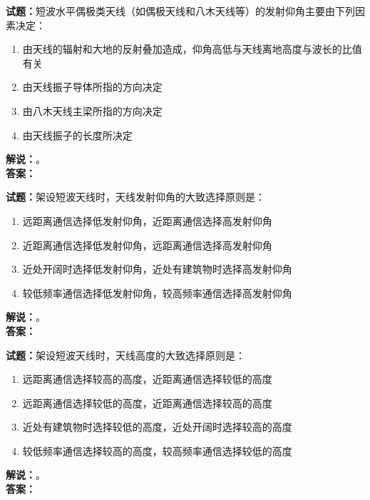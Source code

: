 \documentclass{ctexbook}
\begin{document}
\bigskip




\noindent\textbf{试题：}短波水平偶极类天线（如偶极天线和八木天线等）的发射仰角主要由下列因素决定：
\begin{enumerate}[leftmargin=3em]
\item 由天线的辐射和大地的反射叠加造成，仰角高低与天线离地高度与波长的比值有关
\item 由天线振子导体所指的方向决定
\item 由八木天线主梁所指的方向决定
\item 由天线振子的长度所决定
\end{enumerate}
\noindent\textbf{解说：}\textbf{}。\\\noindent\textbf{答案：}

\bigskip




\noindent\textbf{试题：}架设短波天线时，天线发射仰角的大致选择原则是：
\begin{enumerate}[leftmargin=3em]
\item 远距离通信选择低发射仰角，近距离通信选择高发射仰角
\item 近距离通信选择低发射仰角，远距离通信选择高发射仰角
\item 近处开阔时选择低发射仰角，近处有建筑物时选择高发射仰角
\item 较低频率通信选择低发射仰角，较高频率通信选择高发射仰角
\end{enumerate}
\noindent\textbf{解说：}\textbf{}。\\\noindent\textbf{答案：}

\bigskip




\noindent\textbf{试题：}架设短波天线时，天线高度的大致选择原则是：
\begin{enumerate}[leftmargin=3em]
\item 远距离通信选择较高的高度，近距离通信选择较低的高度
\item 远距离通信选择较低的高度，近距离通信选择较高的高度
\item 近处有建筑物时选择较低的高度，近处开阔时选择较高的高度
\item 较低频率通信选择较高的高度，较高频率通信选择较低的高度
\end{enumerate}
\noindent\textbf{解说：}\textbf{}。\\\noindent\textbf{答案：}

\bigskip
\end{document}
